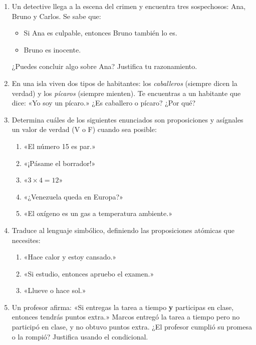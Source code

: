 \documentclass[12pt, letterpaper]{article}
\begin{document}
\begin{enumerate}[leftmargin=*]
  \item \facil{} Un detective llega a la escena del crimen y encuentra tres sospechosos: Ana, Bruno y Carlos. Se sabe que:
        \begin{itemize}
          \item Si Ana es culpable, entonces Bruno también lo es.
          \item Bruno es inocente.
        \end{itemize}
        ¿Puedes concluir algo sobre Ana? Justifica tu razonamiento.

  \item \facil{} En una isla viven dos tipos de habitantes: los \emph{caballeros} (siempre dicen la verdad) y los \emph{pícaros} (siempre mienten). Te encuentras a un habitante que dice: «Yo soy un pícaro.» ¿Es caballero o pícaro? ¿Por qué?

  \item \facil{} Determina cuáles de los siguientes enunciados son proposiciones y asígnales un valor de verdad (V o F) cuando sea posible:
        \begin{enumerate}[label=\alph*)]
          \item «El número 15 es par.»
          \item «¡Pásame el borrador!»
          \item «$3 \times 4 = 12$»
          \item «¿Venezuela queda en Europa?»
          \item «El oxígeno es un gas a temperatura ambiente.»
        \end{enumerate}

  \item \facil{} Traduce al lenguaje simbólico, definiendo las proposiciones atómicas que necesites:
        \begin{enumerate}[label=\alph*)]
          \item «Hace calor y estoy cansado.»
          \item «Si estudio, entonces apruebo el examen.»
          \item «Llueve o hace sol.»
        \end{enumerate}

  \item \medio{} Un profesor afirma: «Si entregas la tarea a tiempo \textbf{y} participas en clase, entonces tendrás puntos extra.» Marcos entregó la tarea a tiempo pero no participó en clase, y no obtuvo puntos extra. ¿El profesor cumplió su promesa o la rompió? Justifica usando el condicional.


\end{enumerate}
\end{document}
